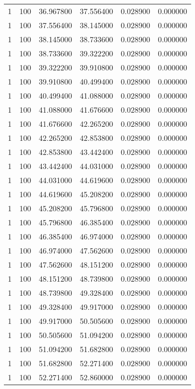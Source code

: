 \begin{longtable}{rrrrrr}
1 & 100 & 36.967800 & 37.556400 & 0.028900 & 0.000000 \\
1 & 100 & 37.556400 & 38.145000 & 0.028900 & 0.000000 \\
1 & 100 & 38.145000 & 38.733600 & 0.028900 & 0.000000 \\
1 & 100 & 38.733600 & 39.322200 & 0.028900 & 0.000000 \\
1 & 100 & 39.322200 & 39.910800 & 0.028900 & 0.000000 \\
1 & 100 & 39.910800 & 40.499400 & 0.028900 & 0.000000 \\
1 & 100 & 40.499400 & 41.088000 & 0.028900 & 0.000000 \\
1 & 100 & 41.088000 & 41.676600 & 0.028900 & 0.000000 \\
1 & 100 & 41.676600 & 42.265200 & 0.028900 & 0.000000 \\
1 & 100 & 42.265200 & 42.853800 & 0.028900 & 0.000000 \\
1 & 100 & 42.853800 & 43.442400 & 0.028900 & 0.000000 \\
1 & 100 & 43.442400 & 44.031000 & 0.028900 & 0.000000 \\
1 & 100 & 44.031000 & 44.619600 & 0.028900 & 0.000000 \\
1 & 100 & 44.619600 & 45.208200 & 0.028900 & 0.000000 \\
1 & 100 & 45.208200 & 45.796800 & 0.028900 & 0.000000 \\
1 & 100 & 45.796800 & 46.385400 & 0.028900 & 0.000000 \\
1 & 100 & 46.385400 & 46.974000 & 0.028900 & 0.000000 \\
1 & 100 & 46.974000 & 47.562600 & 0.028900 & 0.000000 \\
1 & 100 & 47.562600 & 48.151200 & 0.028900 & 0.000000 \\
1 & 100 & 48.151200 & 48.739800 & 0.028900 & 0.000000 \\
1 & 100 & 48.739800 & 49.328400 & 0.028900 & 0.000000 \\
1 & 100 & 49.328400 & 49.917000 & 0.028900 & 0.000000 \\
1 & 100 & 49.917000 & 50.505600 & 0.028900 & 0.000000 \\
1 & 100 & 50.505600 & 51.094200 & 0.028900 & 0.000000 \\
1 & 100 & 51.094200 & 51.682800 & 0.028900 & 0.000000 \\
1 & 100 & 51.682800 & 52.271400 & 0.028900 & 0.000000 \\
1 & 100 & 52.271400 & 52.860000 & 0.028900 & 0.000000 \\

\end{longtable}
